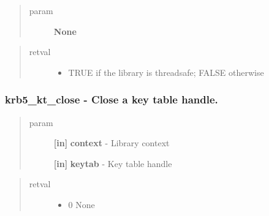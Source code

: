 \documentclass[letterpaper,10pt,english]{sphinxmanual}
\begin{document}
\begin{fulllineitems}
\label{appdev/refs/api/krb5_is_thread_safe:krb5_is_thread_safe}
\end{fulllineitems}

\begin{quote}\begin{description}
\item[{param}] \leavevmode
\textbf{None}

\end{description}\end{quote}
\begin{quote}\begin{description}
\item[{retval}] \leavevmode\begin{itemize}
\item {} 
TRUE   if the library is threadsafe; FALSE otherwise

\end{itemize}

\end{description}\end{quote}


\subsubsection{krb5\_kt\_close -  Close a key table handle.}
\label{appdev/refs/api/krb5_kt_close:krb5-kt-close-close-a-key-table-handle}\label{appdev/refs/api/krb5_kt_close::doc}

\begin{fulllineitems}
\label{appdev/refs/api/krb5_kt_close:krb5_kt_close}
\end{fulllineitems}

\begin{quote}\begin{description}
\item[{param}] \leavevmode
\textbf{{[}in{]}} \textbf{context} - Library context

\textbf{{[}in{]}} \textbf{keytab} - Key table handle

\end{description}\end{quote}
\begin{quote}\begin{description}
\item[{retval}] \leavevmode\begin{itemize}
\item {} 
0   None

\end{itemize}

\end{description}\end{quote}
\end{document}
